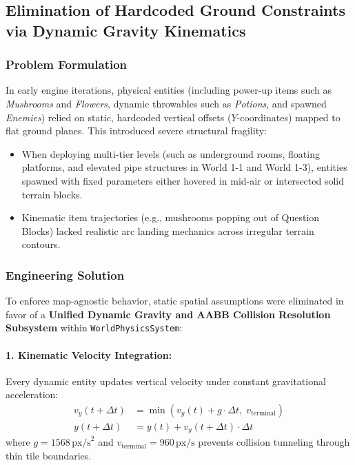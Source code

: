 \subsection{Elimination of Hardcoded Ground Constraints via Dynamic Gravity Kinematics}
\label{subsec:dynamic_gravity}

\subsubsection{Problem Formulation}
In early engine iterations, physical entities (including power-up items such as \textit{Mushrooms} and \textit{Flowers}, dynamic throwables such as \textit{Potions}, and spawned \textit{Enemies}) relied on static, hardcoded vertical offsets ($Y$-coordinates) mapped to flat ground planes. This introduced severe structural fragility:
\begin{itemize}
    \item When deploying multi-tier levels (such as underground rooms, floating platforms, and elevated pipe structures in World 1-1 and World 1-3), entities spawned with fixed parameters either hovered in mid-air or intersected solid terrain blocks.
    \item Kinematic item trajectories (e.g., mushrooms popping out of Question Blocks) lacked realistic arc landing mechanics across irregular terrain contours.
\end{itemize}

\subsubsection{Engineering Solution}
To enforce map-agnostic behavior, static spatial assumptions were eliminated in favor of a \textbf{Unified Dynamic Gravity and AABB Collision Resolution Subsystem} within \texttt{WorldPhysicsSystem}:

\paragraph{1. Kinematic Velocity Integration:} Every dynamic entity updates vertical velocity under constant gravitational acceleration:
\begin{align}
    v_y(t + \Delta t) &= \min\left(v_y(t) + g \cdot \Delta t, \; v_{\text{terminal}}\right) \\
    y(t + \Delta t) &= y(t) + v_y(t + \Delta t) \cdot \Delta t
\end{align}
where $g = 1568\,\text{px/s}^2$ and $v_{\text{terminal}} = 960\,\text{px/s}$ prevents collision tunneling through thin tile boundaries.

